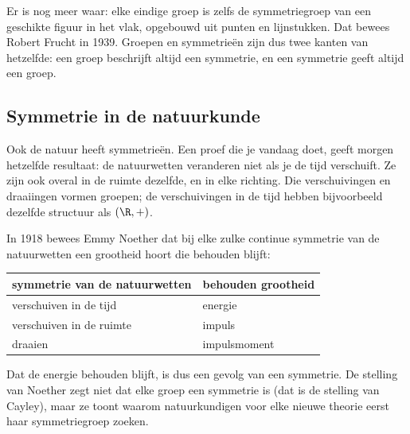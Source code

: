 Er is nog meer waar: elke eindige groep is zelfs de symmetriegroep van een geschikte figuur in het vlak, opgebouwd uit punten en lijnstukken. Dat bewees Robert Frucht in 1939. Groepen en symmetrieën zijn dus twee kanten van hetzelfde: een groep beschrijft altijd een symmetrie, en een symmetrie geeft altijd een groep.

\subsection{Symmetrie in de natuurkunde}

Ook de natuur heeft symmetrieën. Een proef die je vandaag doet, geeft morgen hetzelfde resultaat: de natuurwetten veranderen niet als je de tijd verschuift. Ze zijn ook overal in de ruimte dezelfde, en in elke richting. Die verschuivingen en draaiingen vormen groepen; de verschuivingen in de tijd hebben bijvoorbeeld dezelfde structuur als $(\R, +)$.

In 1918 bewees Emmy Noether dat bij elke zulke continue symmetrie van de natuurwetten een grootheid hoort die behouden blijft:

\begin{center}
\renewcommand{\arraystretch}{1.3}
\begin{tabular}{|l|l|}
\hline
\rowcolor{accent!14} symmetrie van de natuurwetten & behouden grootheid \\ \hline
verschuiven in de tijd & energie \\ \hline
verschuiven in de ruimte & impuls \\ \hline
draaien & impulsmoment \\ \hline
\end{tabular}
\end{center}

Dat de energie behouden blijft, is dus een gevolg van een symmetrie. De stelling van Noether zegt niet dat elke groep een symmetrie is (dat is de stelling van Cayley), maar ze toont waarom natuurkundigen voor elke nieuwe theorie eerst haar symmetriegroep zoeken.

\opdrachtenkop

\begin{oefeningen}















\end{oefeningen}

